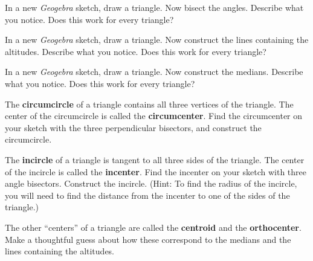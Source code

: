 \begin{prob}
In a new \textsl{Geogebra} sketch, draw a triangle. Now bisect the angles.  Describe what you notice.  Does this work for every
triangle?
\end{prob}

\begin{prob}
In a new \textsl{Geogebra} sketch, draw a triangle. Now construct the lines containing the altitudes.  Describe what you notice.  
Does this work for every triangle?
\end{prob}

\begin{prob}
In a new \textsl{Geogebra} sketch, draw a triangle. Now construct the medians.  Describe what you notice.  Does this work for every triangle?
\end{prob}

\begin{prob}
The \textbf{circumcircle} of a triangle contains all three vertices of the triangle.  The center of the circumcircle is called the \textbf{circumcenter}.  Find the circumcenter on your sketch with the three perpendicular bisectors, and construct the circumcircle.  
\end{prob}

\begin{prob}
The \textbf{incircle} of a triangle is tangent to all three sides of the triangle.  The center of the incircle is called the \textbf{incenter}.  
Find the incenter on your sketch with three angle bisectors. Construct the incircle.  (Hint:  To find the radius of the incircle, you will need to find the distance from the incenter to one of the sides of the triangle.)  
\end{prob}

\begin{prob}
The other ``centers'' of a triangle are called the \textbf{centroid} and the \textbf{orthocenter}.  Make a thoughtful guess about how these correspond to the medians and the lines containing the altitudes.  
\end{prob}


